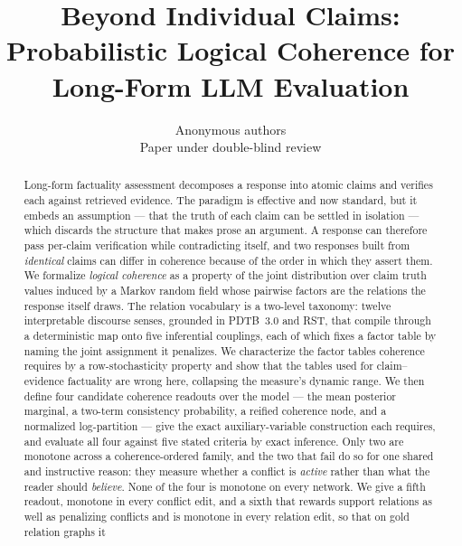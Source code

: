 

\title{Beyond Individual Claims: Probabilistic Logical Coherence
       for Long-Form LLM Evaluation}

\author{Anonymous authors\\Paper under double-blind review}


\maketitle

\begin{abstract}
Long-form factuality assessment decomposes a response into atomic claims and verifies each
against retrieved evidence. The paradigm is effective and now standard, but it embeds an
assumption --- that the truth of each claim can be settled in isolation --- which discards the
structure that makes prose an argument. A response can therefore pass per-claim verification
while contradicting itself, and two responses built from \emph{identical} claims can differ in
coherence because of the order in which they assert them. We formalize \emph{logical coherence}
as a property of the joint distribution over claim truth values induced by a Markov random field
whose pairwise factors are the relations the response itself draws. The relation vocabulary is a
two-level taxonomy: twelve interpretable discourse senses, grounded in PDTB~3.0 and RST, that
compile through a deterministic map onto five inferential couplings, each of which fixes a factor
table by naming the joint assignment it penalizes. We characterize the factor tables coherence
requires by a row-stochasticity property and show that the tables used for claim--evidence
factuality are wrong here, collapsing the measure's dynamic range. We then define four candidate
coherence readouts over the model --- the mean posterior marginal, a two-term consistency
probability, a reified coherence node, and a normalized log-partition --- give the exact
auxiliary-variable construction each requires, and evaluate all four against five stated criteria
by exact inference. Only two are monotone across a coherence-ordered family, and the two that fail do so for
one shared and instructive reason: they measure whether a conflict is \emph{active} rather than
what the reader should \emph{believe}. None of the four is monotone on every network. We give a
fifth readout, monotone in every conflict edit, and a sixth that rewards support relations as well
as penalizing conflicts and is monotone in every relation edit, so that on gold relation graphs it

\end{abstract}
